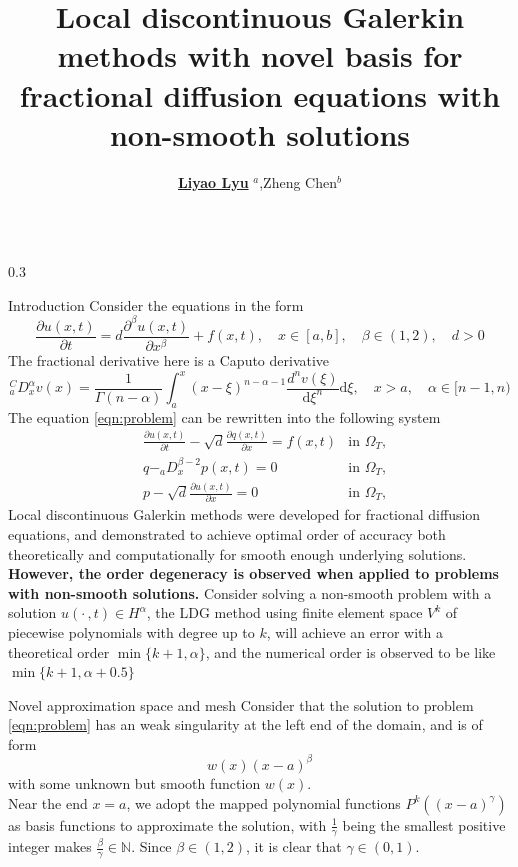 \documentclass{msuposter}
\title{Local discontinuous Galerkin methods with novel basis for fractional diffusion equations with non-smooth solutions}
\author{\href{http://lylyu.com/}{\textbf{Liyao Lyu}} $^a$,Zheng Chen$^b$}
\institute{
$^a$Department of Computational Mathematics, Science and Engineering, Michigan State University
\\
$^b$Department of Mathematics, University of Massachusetts
}
\newcommand{\colwidth}{0.3\linewidth}
\begin{document}
\begin{frame}{}
\begin{columns}[t]
\begin{column}{\colwidth}
\begin{block}{Introduction}
Consider the equations in the form
\begin{equation}\label{eqn:problem}
\frac{\partial u(x,t)}{\partial t} = d \frac{\partial^{\beta} u(x,t)}{\partial x^\beta} + f(x,t), \quad x\in[a,b],\quad \beta\in(1,2),\quad  d>0
\end{equation}
The fractional derivative here is a Caputo derivative
\begin{equation}\label{eqn:def_cd}
{}_a^{C}D_{x}^{\alpha} v(x)=\frac{1}{\Gamma(n-\alpha)} \int_{a}^{x}(x-\xi)^{n-\alpha-1} \frac{d^{n} v(\xi)}{\mathrm{d} \xi^{n}} \mathrm{d} \xi, \quad x>a, \quad \alpha \in[n-1, n)
\end{equation}
The equation \eqref{eqn:problem} can be rewritten into the following system
\begin{equation}\label{local DG}
\begin{aligned}
&\frac{\partial u(x,t)}{\partial t} - \sqrt{d} \frac{\partial q(x,t)}{\partial x} = f(x,t) & \text{in }\Omega_T,\\
& q-_{a}D_{x}^{\beta-2} p(x,t) =0 & \text{in }\Omega_T,\\
& p- \sqrt{d}\frac{\partial u(x,t)}{\partial x}=0& \text{in }\Omega_T,
\end{aligned}
\end{equation}
Local discontinuous Galerkin methods were developed for fractional diffusion equations,
and demonstrated to achieve optimal order of accuracy both theoretically and computationally for smooth enough underlying solutions.
\textbf{However, the order degeneracy is observed when applied to problems with non-smooth solutions.} Consider solving a non-smooth problem with a solution $u(\cdot\, ,t)\in H^\alpha$, the LDG method using finite element space $V^k$ of piecewise polynomials with degree up to $k$, will achieve an error with a theoretical order $\min\{k+1,\alpha\}$, and the numerical order is observed to be like $\min\{k+1,\alpha+0.5\}$

\end{block}
\begin{block}{Novel approximation space and mesh}
	Consider that the solution to problem \eqref{eqn:problem} has an weak singularity at the left end of the domain, and is of form 
	\begin{equation}
	\label{func:solution form}
	w(x) (x-a)^\beta
	\end{equation} 
	with some unknown but smooth function $w(x)$.
	\\
	Near the end $x=a$, we adopt the mapped polynomial functions $P^k((x-a)^\gamma)$ as basis functions to approximate the solution, with $\frac{1}{\gamma}$ being the smallest positive integer makes $\frac{\beta}{\gamma} \in \mathbb{N}$.  
	Since $\beta \in (1,2)$, it is clear that $\gamma \in (0,1)$.\\
	

\end{block}
\end{column}
\end{columns}
\end{frame}
\end{document}
